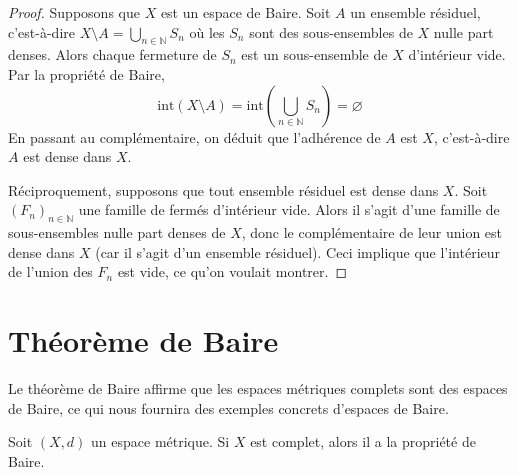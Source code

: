 \begin{proof}
  Supposons que $X$ est un espace de Baire. Soit $A$ un ensemble résiduel,
  c'est-à-dire $X\setminus A = \bigcup_{n\in\mathbb N} S_n$ où les $S_n$ sont
  des sous-ensembles de $X$ nulle part denses. Alors chaque fermeture de $S_n$
  est un sous-ensemble de $X$ d'intérieur vide. Par la propriété de Baire,
  $$\mathrm{int}(X\setminus A) =
  \mathrm{int}\left(\bigcup_{n\in\mathbb N}S_n\right)= \varnothing$$
  En passant au complémentaire, on déduit que l'adhérence de $A$ est $X$,
  c'est-à-dire $A$ est dense dans $X$.

  Réciproquement, supposons que tout ensemble résiduel est dense dans $X$.
  Soit $(F_n)_{n\in\mathbb N}$ une famille de fermés d'intérieur vide. Alors
  il s'agit d'une famille de sous-ensembles nulle part denses de $X$, donc
  le complémentaire de leur union est dense dans $X$ (car il s'agit d'un
  ensemble résiduel). Ceci implique que l'intérieur de l'union des $F_n$
  est vide, ce qu'on voulait montrer.
\end{proof}


\section{Théorème de Baire}
Le théorème de Baire affirme que les espaces métriques complets
sont des espaces de Baire, ce qui nous fournira des exemples
concrets d'espaces de Baire.

\begin{thm}
  Soit $(X, d)$ un espace métrique. Si $X$ est complet, alors
  il a la propriété de Baire.
\end{thm}

